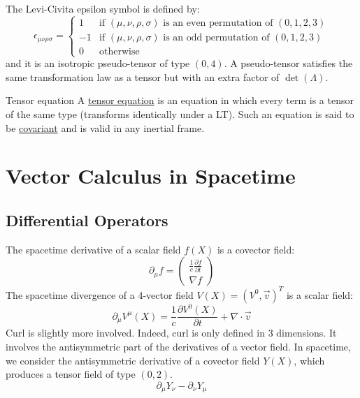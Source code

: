 \documentclass[../Main.tex]{subfiles}
\begin{document}
The Levi-Civita epsilon symbol is defined by:
\begin{equation*}
    \epsilon_{\mu\nu\rho\sigma} =
    \begin{cases}
        1 & \text{if $(\mu, \nu, \rho, \sigma)$ is an even permutation of $(0,1,2,3)$} \\
        -1 & \text{if $(\mu, \nu, \rho, \sigma)$ is an odd permutation of $(0,1,2,3)$} \\
        0 & \text{otherwise}
    \end{cases}
\end{equation*}
and it is an isotropic pseudo-tensor of type $(0, 4)$. A pseudo-tensor satisfies the same transformation law as a tensor but with an extra factor of $\det(\Lambda)$.
\begin{definition}{Tensor equation}
    A \underline{tensor equation} is an equation in which every term is a tensor of the same type (transforms identically under a LT). Such an equation is said to be \underline{covariant} and is valid in any inertial frame.
\end{definition}
\section{Vector Calculus in Spacetime}
\subsection{Differential Operators}
The spacetime derivative of a scalar field $f(X)$ is a covector field:
\begin{equation*}
    \partial_\mu f = \begin{pmatrix}\frac1c \frac{\partial f}{\partial t} \\ \nabla f\end{pmatrix}
\end{equation*}
The spacetime divergence of a 4-vector field $V(X) = (V^0, \vec{v})^T$ is a scalar field:
\begin{equation*}
    \partial_\mu V^\mu(X) = \frac1c \frac{\partial V^0(X)}{\partial t} + \nabla \cdot \vec{v}
\end{equation*}
Curl is slightly more involved. Indeed, curl is only defined in $3$ dimensions. It involves the antisymmetric part of the derivatives of a vector field. In spacetime, we consider the antisymmetric derivative of a covector field $Y(X)$, which produces a tensor field of type $(0, 2)$.
\begin{equation*}
    \partial_\mu Y_\nu - \partial_\nu Y_\mu
\end{equation*}
\end{document}
